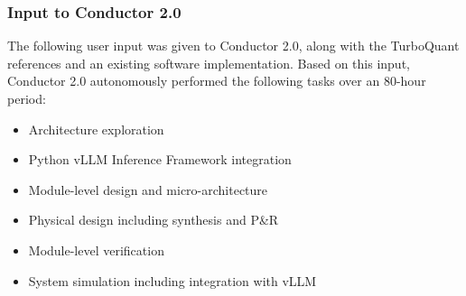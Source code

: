 \subsubsection{Input to Conductor 2.0}

The following user input was given to Conductor 2.0, along with the TurboQuant references and an existing software implementation. Based on this input, Conductor 2.0 autonomously performed the following tasks over an 80-hour period:

\begin{itemize}
	\item Architecture exploration
	\item Python vLLM Inference Framework integration
	\item Module-level design and micro-architecture
	\item Physical design including synthesis and P\&R
	\item Module-level verification
	\item System simulation including integration with vLLM\\
\end{itemize}

